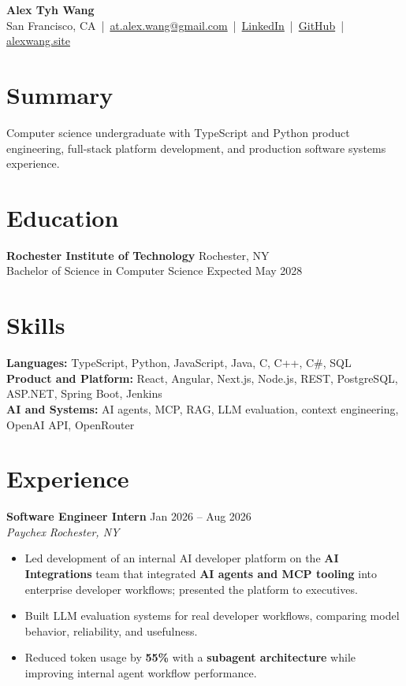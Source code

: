 \documentclass[10pt,letterpaper]{article}
\newcommand{\resumeRole}[4]{%
  \textbf{#1} \hfill #2\\
  \textit{#3} \hfill \textit{#4}
}
\begin{document}
\begin{center}
{\Large \textbf{Alex Tyh Wang}}\\
San Francisco, CA \,|\, \href{mailto:at.alex.wang@gmail.com}{at.alex.wang@gmail.com} \,|\, \href{https://www.linkedin.com/in/alex-tyh-wang/}{LinkedIn} \,|\, \href{https://github.com/alextyhwang}{GitHub} \,|\, \href{https://alexwang.site}{alexwang.site}
\end{center}

\section*{Summary}
Computer science undergraduate with TypeScript and Python product engineering, full-stack platform development, and production software systems experience.

\section*{Education}
\textbf{Rochester Institute of Technology} \hfill Rochester, NY\\
Bachelor of Science in Computer Science \hfill Expected May 2028

\section*{Skills}
\textbf{Languages:} TypeScript, Python, JavaScript, Java, C, C++, C\#, SQL\\
\textbf{Product and Platform:} React, Angular, Next.js, Node.js, REST, PostgreSQL, ASP.NET, Spring Boot, Jenkins\\
\textbf{AI and Systems:} AI agents, MCP, RAG, LLM evaluation, context engineering, OpenAI API, OpenRouter
\section*{Experience}
\resumeRole{Software Engineer Intern}{Jan 2026 -- Aug 2026}{Paychex}{Rochester, NY}
\begin{itemize}
  \item Led development of an internal AI developer platform on the \textbf{AI Integrations} team that integrated \textbf{AI agents and MCP tooling} into enterprise developer workflows; presented the platform to executives.
  \item Built LLM evaluation systems for real developer workflows, comparing model behavior, reliability, and usefulness.
  \item Reduced token usage by \textbf{55\%} with a \textbf{subagent architecture} while improving internal agent workflow performance.
\end{itemize}
\end{document}
